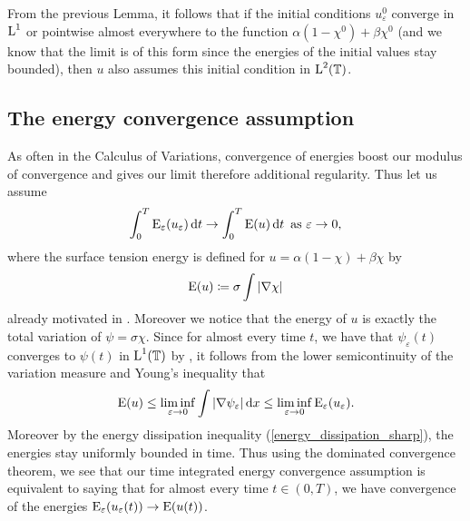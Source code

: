 \begin{remark}
	From the previous Lemma, it follows that if the initial conditions $ u_{ \varepsilon }^{ 0 } $ converge in $ \operatorname{L}^{ 1 } $ or pointwise almost everywhere to the function $ \alpha ( 1 - \chi^{ 0 } ) + \beta \chi^{ 0 } $ (and we know that the limit is of this form since the energies of the initial values stay bounded), then $ u $ also assumes this initial condition in $ \operatorname{L}^{ 2 } ( \operatorname{\mathbb{T}} ) $.
\end{remark}

\subsection{The energy convergence assumption}

As often in the Calculus of Variations, convergence of energies boost our modulus of convergence and gives our limit therefore additional regularity. 
Thus let us assume 
\begin{equation}
	\label{energy_convergence}
	\int_{ 0 }^{ T }
	\operatorname{E}_{ \varepsilon } ( u_{ \varepsilon } ) 
	\dd{ t }
	\to 
	\int_{ 0 }^{ T }
	\operatorname{E} ( u )
	\dd{ t }
	\text{ as }
	\varepsilon \to 0,
\end{equation}
where the surface tension energy is defined for $ u = \alpha ( 1 - \chi ) + \beta \chi $ by 
\begin{equation}
	\operatorname{E} ( u ) 
	\coloneqq
	\sigma \int \abs{ \nabla \chi }
\end{equation}
already motivated in .
Moreover we notice that the energy of $ u $ is exactly the total variation of $ \psi = \sigma \chi $.
Since for almost every time $ t $, we have that $ \psi_{ \varepsilon } ( t ) $ converges to $ \psi ( t ) $ in $ \operatorname{L}^{ 1 }  ( \operatorname{\mathbb{T}} ) $ by , it follows from the lower semicontinuity of the variation measure and Young's inequality that
\begin{equation*}
	\operatorname{E} ( u ) 
	\leq
	\liminf_{ \varepsilon \to 0 }
	\int
	\abs{ \nabla \psi_{ \varepsilon } }
	\dd{ x }
	\leq
	\liminf_{ \varepsilon \to 0 }
	\operatorname{E}_{ \varepsilon } ( u_{ \varepsilon } ).
\end{equation*}
Moreover by the energy dissipation inequality (\ref{energy_dissipation_sharp}), the energies stay uniformly bounded in time. Thus using the dominated convergence theorem, we see that our time integrated energy convergence assumption is equivalent to saying that for almost every time $ t \in ( 0, T ) $, we have convergence of the energies $ \operatorname{E}_{ \varepsilon } ( u_{ \varepsilon } ( t ) ) \to \operatorname{E} ( u ( t ) ) $.

